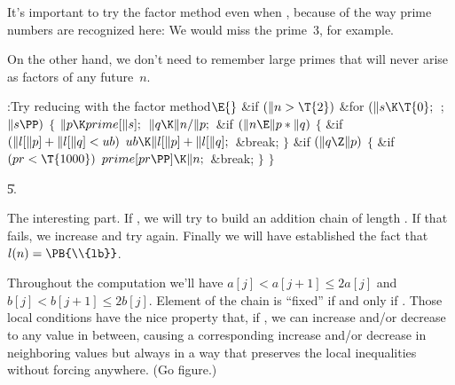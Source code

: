 It's important to try the factor method even when , because
of the way prime numbers are recognized here: We would miss the
prime~3, for example.

On the other hand, we don't need to remember large primes that will
never arise as factors of any future~$n$.

\Y\B\4:Try reducing  with the factor method\X${}\E{}$\6
\&{if} ${}(\|n>\T{2}){}$\1\6
\&{for} ${}(\|s\K\T{0};{}$  ; ${}\|s\PP){}$\5
${}\{{}$\1\6
${}\|p\K\\{prime}[\|s];{}$\6
${}\|q\K\|n/\|p;{}$\6
\&{if} ${}(\|n\E\|p*\|q){}$\5
${}\{{}$\1\6
\&{if} ${}(\|l[\|p]+\|l[\|q]<\\{ub}){}$\1\5
${}\\{ub}\K\|l[\|p]+\|l[\|q];{}$\2\6
\&{break};\6
\4${}\}{}$\2\6
\&{if} ${}(\|q\Z\|p){}$\5
${}\{{}$\1\6
\&{if} ${}(\\{pr}<\T{1000}){}$\1\5
${}\\{prime}[\\{pr}\PP]\K\|n;{}$\2\6
\&{break};\6
\4${}\}{}$\2\6
\4${}\}{}$\2\2\par
\U5.\fi

The interesting part.
If , we will try to build an addition chain of length .
If that fails, we increase  and try again. Finally we will
have established the fact that $l(n)=\PB{\\{lb}}$.

Throughout the computation we'll have $a[j]<a[j+1]\le2a[j]$ and
$b[j]<b[j+1]\le2b[j]$.
Element  of the chain is ``fixed'' if and only if .
Those local conditions have the nice property that, if ,
we can increase  and/or decrease  to any value in
between,
causing a corresponding increase and/or decrease in neighboring
values but always in a way that preserves the local inequalities
without forcing  anywhere. (Go figure.)

